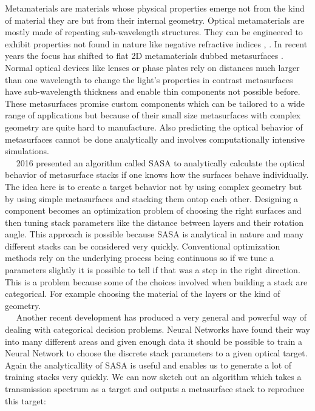 Metamaterials are materials whose physical properties emerge not from the kind of material they are but from their internal geometry. Optical metamaterials are mostly made of repeating sub-wavelength structures. They can be engineered to exhibit properties not found in nature like negative refractive indices \cite{Shelby2001}, . In recent years the focus has shifted to flat 2D metamaterials dubbed metasurfaces \cite{Yu2014}. Normal optical devices like lenses or phase plates rely on distances much larger than one wavelength to change the light's properties in contrast metasurfaces have sub-wavelength thickness and enable thin components not possible before.  These metasurfaces promise custom components which can be tailored to a wide range of applications
but because of their small size metasurfaces with complex geometry are quite hard to manufacture. Also predicting the optical behavior of metasurfaces cannot be done analytically and involves computationally intensive simulations.
\\

$\quad$
2016 \cite{Menzel2016} presented an algorithm called SASA to analytically calculate the optical behavior of metasurface stacks if one knows how the surfaces behave individually. The idea here is to create a target behavior not by using complex geometry but by using simple metasurfaces and stacking them ontop each other. Designing a component becomes an optimization problem of choosing the right surfaces and then tuning stack parameters like the distance between layers and their rotation angle. This approach is possible because SASA is analytical in nature and many different stacks can be considered very quickly. Conventional optimization methods rely on the underlying process being continuous so if we tune a parameters slightly it is possible to tell if that was a step in the right direction. This is a problem because some of the choices involved when building a stack are categorical. For example choosing the material of the layers or the kind of geometry.
\\

$\quad$
Another recent development has produced a very general and powerful way of dealing with categorical decision problems. Neural Networks have found their way into many different areas and given enough data it should be possible to train a Neural Network to choose the discrete stack parameters to a given optical target. Again the analyticallity of SASA is useful and enables us to generate a lot of training stacks very quickly. We can now sketch out an algorithm which takes a transmission spectrum as a target and outputs a  metasurface stack to reproduce this target:
\\

